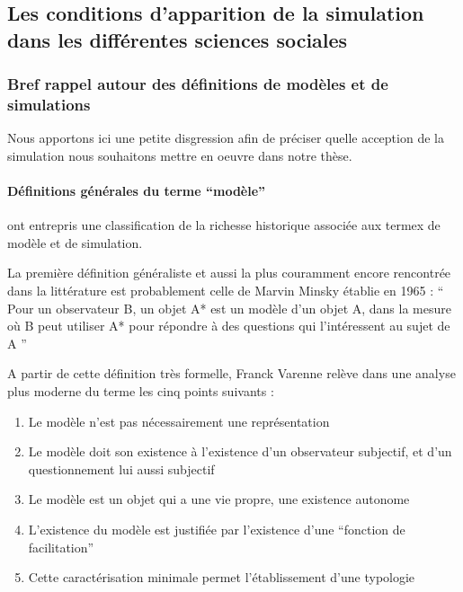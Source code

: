 \subsection{Les conditions d'apparition de la simulation dans les différentes sciences sociales }
\label{sec:apparition_simu_science_sociales}

\subsubsection{Bref rappel autour des définitions de modèles et de simulations}
\label{ssec:rapell_termes_generiques}

Nous apportons ici une petite disgression afin de préciser quelle acception de la simulation nous souhaitons mettre en oeuvre dans notre thèse.

\paragraph{Définitions générales du terme \enquote{modèle}}

\textcite{Varenne2013} ont entrepris une classification de la richesse historique associée aux termex de modèle et de simulation.

La première définition généraliste et aussi la plus couramment encore rencontrée dans la littérature est probablement celle de Marvin Minsky établie en 1965 \autocite{Varenne2008} \autocite[15]{Varenne2013}  : \enquote{ Pour un observateur B, un objet A* est un modèle d’un objet A, dans la mesure où B peut utiliser A* pour répondre à des questions qui l’intéressent au sujet de A } \autocite{Minsky1965}

A partir de cette définition très formelle, Franck Varenne \autocite{Varenne2008} relève dans une analyse plus moderne du terme les cinq points suivants : 
\begin{enumerate}
  \item Le modèle n'est pas nécessairement une représentation
  \item Le modèle doit son existence à l'existence d'un observateur subjectif, et d'un questionnement lui aussi subjectif
  \item Le modèle est un objet qui a une vie propre, une existence autonome
  \item L'existence du modèle est justifiée par l'existence d'une \enquote{fonction de facilitation}
  \item Cette caractérisation minimale permet l'établissement d'une typologie
\end{enumerate}

